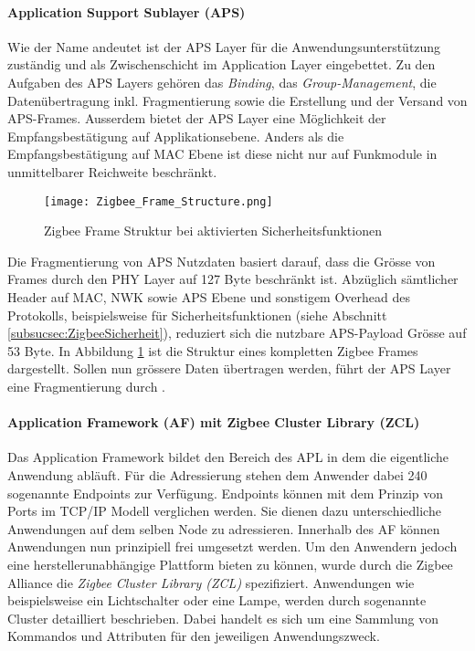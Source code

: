 \paragraph{Application Support Sublayer (APS)}
Wie der Name andeutet ist der APS Layer für die Anwendungsunterstützung zuständig und als Zwischenschicht im Application Layer eingebettet.
Zu den Aufgaben des APS Layers gehören das \textit{Binding}, das \textit{Group-Management}, die Datenübertragung inkl. Fragmentierung sowie die Erstellung und der Versand von APS-Frames.
Ausserdem bietet der APS Layer eine Möglichkeit der Empfangsbestätigung auf Applikationsebene.
Anders als die Empfangsbestätigung auf MAC Ebene ist diese nicht nur auf Funkmodule in unmittelbarer Reichweite beschränkt.

\begin{figure}[h]
	\centering
	\texttt{[image: Zigbee\_Frame\_Structure.png]}
	\caption{Zigbee Frame Struktur bei aktivierten Sicherheitsfunktionen \cite[S.~286]{markus_krause_rainer_konrad_zigbee_2014}}
	\label{fig:ZigbeeFrameStruktur}
\end{figure}

Die Fragmentierung von APS Nutzdaten basiert darauf, dass die Grösse von Frames durch den PHY Layer auf 127 Byte beschränkt ist.
Abzüglich sämtlicher Header auf MAC, NWK sowie APS Ebene und sonstigem Overhead des Protokolls, beispielsweise für Sicherheitsfunktionen (siehe Abschnitt \ref{subsucsec:ZigbeeSicherheit}), reduziert sich die nutzbare APS-Payload Grösse auf 53 Byte. In Abbildung \ref{fig:ZigbeeFrameStruktur} ist die Struktur eines kompletten Zigbee Frames dargestellt.
Sollen nun grössere Daten übertragen werden, führt der APS Layer eine Fragmentierung durch \cite[S.~279 - 299]{markus_krause_rainer_konrad_zigbee_2014}.


\paragraph{Application Framework (AF) mit Zigbee Cluster Library (ZCL)}
Das Application Framework bildet den Bereich des APL in dem die eigentliche Anwendung abläuft. Für die Adressierung stehen dem Anwender dabei 240 sogenannte Endpoints zur Verfügung. Endpoints können mit dem Prinzip von Ports im TCP/IP Modell verglichen werden.
Sie dienen dazu unterschiedliche Anwendungen auf dem selben Node zu adressieren.
Innerhalb des AF können Anwendungen nun prinzipiell frei umgesetzt werden.
Um den Anwendern jedoch eine herstellerunabhängige Plattform bieten zu können, wurde durch die Zigbee Alliance die \textit{Zigbee Cluster Library (ZCL)} spezifiziert.
Anwendungen wie beispielsweise ein Lichtschalter oder eine Lampe, werden durch sogenannte Cluster detailliert beschrieben.
Dabei handelt es sich um eine Sammlung von Kommandos und Attributen für den jeweiligen Anwendungszweck. \cite{the_zigbee_alliance_zigbee_2016}

